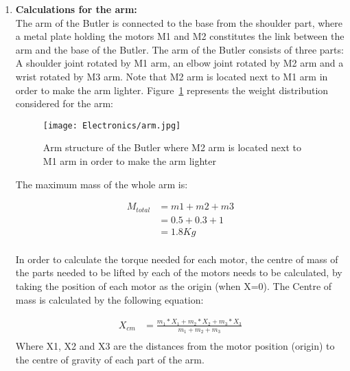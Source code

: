\begin{enumerate}
\item \textbf{Calculations for the arm:}\\
The arm of the Butler is connected to the base from the shoulder part, where a metal plate holding the motors M1 and M2 constitutes the link between the arm and the base of the Butler.
The arm of the Butler consists of three parts: A shoulder joint rotated by M1 arm, an elbow joint rotated by M2 arm and a wrist rotated by M3 arm. Note that M2 arm is located next to M1 arm in order to make the arm lighter. Figure~\ref{fig:Arm structure of the Butler}  represents the weight distribution considered for the arm:

\begin{figure}[h!]
\centering
\captionsetup{justification=centering}
\texttt{[image: Electronics/arm.jpg]}
\caption{Arm structure of the Butler where M2 arm is located next to M1 arm in order to make the arm lighter}
\label{fig:Arm structure of the Butler}
\end{figure}


The maximum mass of the whole arm  is:

\begin{equation} \label{eq:m_total}
\begin{split}
M_{total} & = m1 + m2 + m3\\
& = 0.5 + 0.3 + 1\\
& = 1.8 Kg\\
\end{split}
\end{equation}

In order to calculate the torque needed for each motor, the centre of mass of the parts needed to be lifted by each of the motors needs to be calculated, by taking the position of each motor as the origin (when X=0).
The Centre of mass is calculated by the following equation:

\begin{equation} \label{eq: X_cm}
\begin{split}
X_{cm} & = \frac{m_1*X_1 + m_2*X_2 + m_3*X_3}{m_1 + m_2 + m_3} \\ 
\end{split}
\end{equation}
Where X1, X2 and X3 are the distances from the motor position (origin) to the centre of gravity of each part of the arm.\\

\begin{itemize}


\end{itemize}
\end{enumerate}
